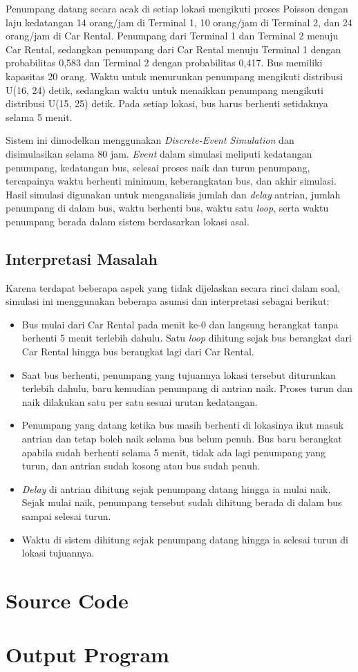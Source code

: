 \documentclass[12pt,a4paper]{article}
\begin{document}
Penumpang datang secara acak di setiap lokasi mengikuti proses Poisson dengan laju kedatangan 14 orang/jam di Terminal 1, 10 orang/jam di Terminal 2, dan 24 orang/jam di Car Rental. Penumpang dari Terminal 1 dan Terminal 2 menuju Car Rental, sedangkan penumpang dari Car Rental menuju Terminal 1 dengan probabilitas 0,583 dan Terminal 2 dengan probabilitas 0,417. Bus memiliki kapasitas 20 orang. Waktu untuk menurunkan penumpang mengikuti distribusi U(16, 24) detik, sedangkan waktu untuk menaikkan penumpang mengikuti distribusi U(15, 25) detik. Pada setiap lokasi, bus harus berhenti setidaknya selama 5 menit.

Sistem ini dimodelkan menggunakan \textit{Discrete-Event Simulation} dan disimulasikan selama 80 jam. \textit{Event} dalam simulasi meliputi kedatangan penumpang, kedatangan bus, selesai proses naik dan turun penumpang, tercapainya waktu berhenti minimum, keberangkatan bus, dan akhir simulasi. Hasil simulasi digunakan untuk menganalisis jumlah dan \textit{delay} antrian, jumlah penumpang di dalam bus, waktu berhenti bus, waktu satu \textit{loop}, serta waktu penumpang berada dalam sistem berdasarkan lokasi asal.

\subsection*{Interpretasi Masalah}

Karena terdapat beberapa aspek yang tidak dijelaskan secara rinci dalam soal, simulasi ini menggunakan beberapa asumsi dan interpretasi sebagai berikut:

\begin{itemize}[itemsep=2pt]
  \item Bus mulai dari Car Rental pada menit ke-0 dan langsung berangkat tanpa berhenti 5 menit terlebih dahulu. Satu \textit{loop} dihitung sejak bus berangkat dari Car Rental hingga bus berangkat lagi dari Car Rental.
  \item Saat bus berhenti, penumpang yang tujuannya lokasi tersebut diturunkan terlebih dahulu, baru kemudian penumpang di antrian naik. Proses turun dan naik dilakukan satu per satu sesuai urutan kedatangan.
  \item Penumpang yang datang ketika bus masih berhenti di lokasinya ikut masuk antrian dan tetap boleh naik selama bus belum penuh. Bus baru berangkat apabila sudah berhenti selama 5 menit, tidak ada lagi penumpang yang turun, dan antrian sudah kosong atau bus sudah penuh.
  \item \textit{Delay} di antrian dihitung sejak penumpang datang hingga ia mulai naik. Sejak mulai naik, penumpang tersebut sudah dihitung berada di dalam bus sampai selesai turun.
  \item Waktu di sistem dihitung sejak penumpang datang hingga ia selesai turun di lokasi tujuannya.
\end{itemize}

\newpage
\section{Source Code}



\newpage
\section{Output Program}

\end{document}
